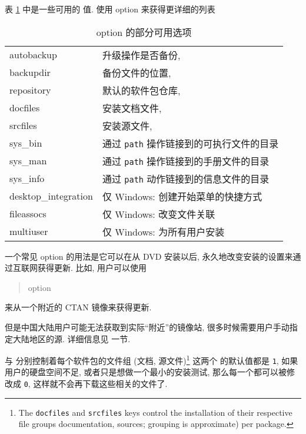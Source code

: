 表 \ref{tab:option} 中是一些可用的  值. 使用 \tlmgr{} \ac{option}  来获得更详细的列表 

\begin{table}[!hpb]
    \caption{\tlmgr{} \ac{option} 的部分可用选项}\label{tab:option}
    \begin{center}
        \begin{small}
        \begin{tabular}{>{\ttfamily}ll}
            autobackup & 升级操作是否备份,\\
            backupdir & 备份文件的位置,\\
            repository & 默认的软件包仓库,\\
            docfiles & 安装文档文件,\\
            srcfiles & 安装源文件,\\
            sys\_bin &  通过 \texttt{path} 操作链接到的可执行文件的目录\\
            sys\_man &  通过 \texttt{path} 操作链接到的手册文件的目录\\
            sys\_info&  通过 \texttt{path} 动作链接到的信息文件的目录\\
            desktop\_integration & 仅 Windows: 创建开始菜单的快捷方式\\
            fileassocs&  仅 Windows: 改变文件关联\\
            multiuser & 仅 Windows: 为所有用户安装\\
        \end{tabular}
        \end{small}
    \end{center}
\end{table}


一个常见 \ac{option} 的用法是它可以在从 DVD 安装以后, 永久地改变安装的设置来通过互联网获得更新. 比如, 用户可以使用
\begin{quote}
    \tlmgr{} \ac{option}  
\end{quote}
来从一个附近的 CTAN 镜像来获得更新. 

但是中国大陆用户可能无法获取到实际``附近''的镜像站, 很多时候需要用户手动指定大陆地区的源. 详细信息见  一节. 

 与  分别控制着每个软件包的文件组 (文档, 源文件)\footnote{The \texttt{\scriptsize docfiles} and \texttt{\scriptsize srcfiles} keys control the installation of their respective file groups documentation, sources; grouping is approximate) per package.} 这两个  的默认值都是 \texttt{1}, 如果用户的硬盘空间不足, 或者只是想做一个最小的安装测试, 那么每一个都可以被修改成 \texttt{0}, 这样就不会再下载这些相关的文件了. 

